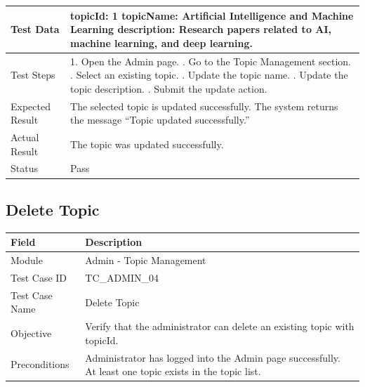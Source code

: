 \documentclass[12pt,a4paper]{article}
\begin{document}
{{\begin{longtable}{|p{4cm}|p{10cm}|}
	Test Data &
	topicId: 1 \newline
	topicName: Artificial Intelligence and Machine Learning \newline
	description: Research papers related to AI, machine learning, and deep learning.
	\\ \hline
	
	Test Steps &
	1. Open the Admin page. \newline
	2. Go to the Topic Management section. \newline
	3. Select an existing topic. \newline
	4. Update the topic name. \newline
	5. Update the topic description. \newline
	6. Submit the update action.
	\\ \hline
	
	Expected Result &
	The selected topic is updated successfully. The system returns the message ``Topic updated successfully.'' \\ \hline
	
	Actual Result &
	The topic was updated successfully. \\ \hline
	
	Status & Pass \\ \hline
	
\end{longtable}
\subsection{Delete Topic}
\begin{longtable}{|p{4cm}|p{10cm}|}
	\hline
	\textbf{Field} & \textbf{Description} \\ \hline
	
	Module & Admin - Topic Management \\ \hline
	
	Test Case ID & TC\_ADMIN\_04 \\ \hline
	
	Test Case Name & Delete Topic \\ \hline
	
	Objective &
	Verify that the administrator can delete an existing topic with topicId. \\ \hline
	
	Preconditions &
	Administrator has logged into the Admin page successfully. \newline
	At least one topic exists in the topic list.
	\\ \hline
	

\end{longtable}}}
\end{document}
